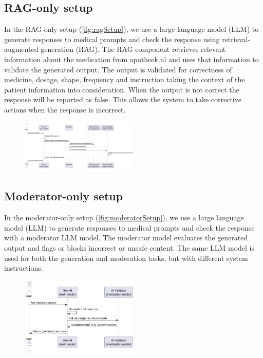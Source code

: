 \subsection{RAG-only setup}

In the RAG-only setup (\autoref{fig:ragSetup}), we use a large language model (LLM) to generate responses to medical prompts and check the response using retrieval-augmented generation (RAG).
The RAG component retrieves relevant information about the medication from apotheek.nl and uses that information to validate the generated output.
The output is validated for correctness of medicine, dosage, shape, frequency and instruction taking the context of the patient information into consideration.
When the output is not correct the response will be reported as false.
This allows the system to take corrective actions when the response is incorrect.

\begin{figure}[H]
    \includegraphics[width=0.5\textwidth]{figures/RAGSetupSequenceDiagram.png}
    \label{fig:ragSetup}
\end{figure}

\subsection{Moderator-only setup}

In the moderator-only setup (\autoref{fig:moderatorSetup}), we use a large language model (LLM) to generate responses to medical prompts and check the response with a moderator LLM model.
The moderator model evaluates the generated output and flags or blocks incorrect or unsafe content.
The same LLM model is used for both the generation and moderation tasks, but with different system instructions.

\begin{figure}[H]
    \includegraphics[width=0.5\textwidth]{figures/moderatorSetupSequenceDiagram.png}
    \label{fig:moderatorSetup}
\end{figure}

